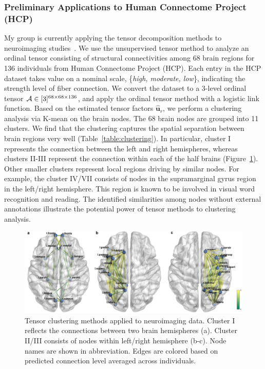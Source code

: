 \documentclass[10pt]{article}
\theoremstyle{definition}
\theoremstyle{definition}
\theoremstyle{definition}
\begin{document}
\subsubsection{Preliminary Applications to Human Connectome Project (HCP)} 
My group is currently applying the tensor decomposition methods to neuroimaging studies~\cite{geddes2016human}. We use the unsupervised tensor method to analyze an ordinal tensor consisting of structural connectivities among 68 brain regions for 136 individuals from Human Connectome Project (HCP). Each entry in the HCP dataset takes value on a nominal scale, \{{\it high, moderate, low}\}, indicating the strength level of fiber connection. We convert the dataset to a 3-level ordinal tensor $\mathcal{A}\in[3]^{68\times 68\times 136}$, and apply the ordinal tensor method with a logistic link function. Based on the estimated tensor factors $\mathbf{\hat u}_r$, we perform a clustering analysis via K-mean on the brain nodes. The 68 brain nodes are grouped into 11 clusters. We find that the clustering captures the spatial separation between brain regions very well (Table~\ref{table:clustering}). In particular, cluster I represents the connection between the left and right hemispheres, whereas clusters II-III represent the connection within each of the half brains (Figure~\ref{figure:brain image}). Other smaller clusters represent local regions driving by similar nodes. For example, the cluster IV/VII consists of nodes in the supramarginal gyrus region in the left/right hemisphere. This region is known to be involved in visual word recognition and reading. The identified similarities among nodes without external annotations illustrate the potential power of tensor methods to clustering analysis. 


\begin{figure}[ht]
\centering
\includegraphics[width = .7\textwidth]{HCP.pdf}
\caption{Tensor clustering methods applied to neuroimaging data. Cluster I reflects the connections between two brain hemispheres (a). Cluster II/III consists of nodes within left/right hemisphere (b-c). Node names are shown in abbreviation. Edges are colored based on predicted connection level averaged across individuals. }  \label{figure:brain image}
\end{figure}
\end{document}
